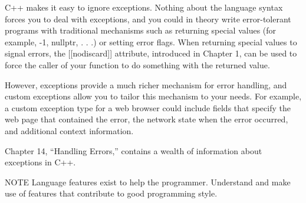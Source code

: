 C++ makes it easy to ignore exceptions. Nothing about the language syntax forces you to deal with exceptions, and you could in theory write error-tolerant programs with traditional mechanisms such as returning special values (for example, -1, nullptr, . . .) or setting error flags. When returning special values to signal errors, the [[nodiscard]] attribute, introduced in Chapter 1, can be used to force the caller of your function to do something with the returned value.

However, exceptions provide a much richer mechanism for error handling, and custom exceptions allow you to tailor this mechanism to your needs. For example, a custom exception type for a web browser could include fields that specify the web page that contained the error, the network state when the error occurred, and additional context information.

Chapter 14, “Handling Errors,” contains a wealth of information about exceptions in C++.

\begin{myNotic}{NOTE}
Language features exist to help the programmer. Understand and make use of features that contribute to good programming style.
\end{myNotic}













